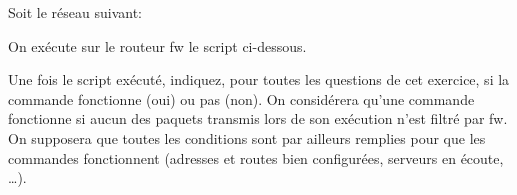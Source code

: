 
Soit le réseau suivant:
\begin{center}\end{center}

On exécute sur le routeur fw le script ci-dessous.


Une fois le script exécuté, indiquez, pour toutes les questions de cet
exercice, si la commande fonctionne (oui) ou pas (non). On considérera
qu'une commande fonctionne si aucun des paquets transmis lors de son
exécution n'est filtré par fw. On supposera que toutes les conditions
sont par ailleurs remplies pour que les commandes fonctionnent
(adresses et routes bien configurées, serveurs en écoute, \ldots).
